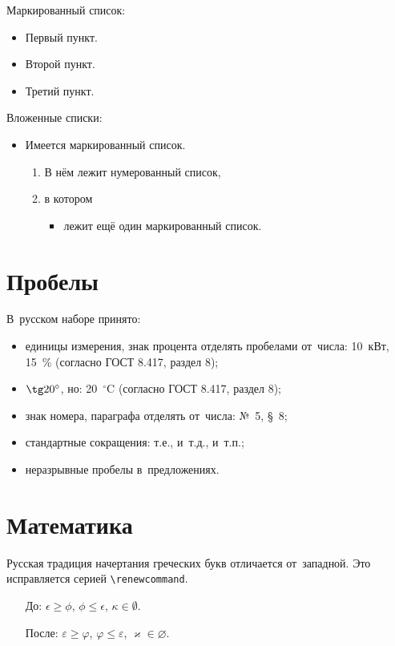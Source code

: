 \noindent Маркированный список:
\begin{itemize}
  \item Первый пункт.
  \item Второй пункт.
  \item Третий пункт.
\end{itemize}

\noindent Вложенные списки:
\begin{itemize}
  \item Имеется маркированный список.
  \begin{enumerate}
    \item В нём лежит нумерованный список,
    \item в котором
    \begin{itemize}
      \item лежит ещё один маркированный список.
    \end{itemize}    
  \end{enumerate}
\end{itemize}


\section{Пробелы}

В~русском наборе принято:
\begin{itemize}
    \item единицы измерения, знак процента отделять пробелами от~числа: 10~кВт, 15~\% (согласно ГОСТ 8.417, раздел 8);
    \item $\tg 20^\circ$, но: 20~${}^\circ$C (согласно ГОСТ 8.417, раздел 8);
    \item знак номера, параграфа отделять от~числа: №~5, \S~8;
    \item стандартные сокращения: т.\:е., и~т.\:д., и~т.\:п.;
    \item неразрывные пробелы в~предложениях.
\end{itemize}

\section{Математика}

Русская традиция начертания греческих букв отличается от~западной. Это исправляется серией \verb|\renewcommand|.
\begin{itemize}
    \item[До:] $ \epsilon \ge \phi$, $\phi \leq \epsilon$, $\kappa \in \emptyset$.
    \renewcommand{\epsilon}{\ensuremath{\varepsilon}}
    \renewcommand{\phi}{\ensuremath{\varphi}}
    \renewcommand{\kappa}{\ensuremath{\varkappa}}
    \renewcommand{\le}{\ensuremath{\leqslant}}
    \renewcommand{\leq}{\ensuremath{\leqslant}}
    \renewcommand{\ge}{\ensuremath{\geqslant}}
    \renewcommand{\geq}{\ensuremath{\geqslant}}
    \renewcommand{\emptyset}{\varnothing}
    \item[После:] $\epsilon \ge \phi$, $\phi \leq \epsilon$, $\kappa \in \emptyset$.
\end{itemize}

